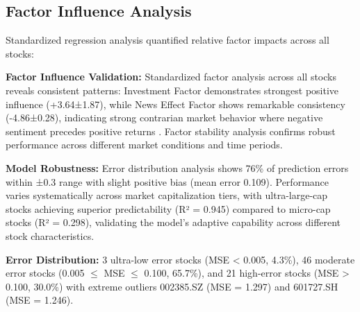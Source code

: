 \documentclass[3p,times,procedia]{elsarticle}
\begin{document}
\FloatBarrier
\subsection{Factor Influence Analysis}
Standardized regression analysis quantified relative factor impacts across all stocks:

\begin{table}[H]
\centering
\caption{\textbf{Factor Influence Analysis}}
\renewcommand{\arraystretch}{1.3} %
\end{table}

\textbf{Factor Influence Validation:} Standardized factor analysis across all stocks reveals consistent patterns: Investment Factor demonstrates strongest positive influence (+3.64±1.87), while News Effect Factor shows remarkable consistency (-4.86±0.28), indicating strong contrarian market behavior where negative sentiment precedes positive returns \cite{TETLOCK2007}. Factor stability analysis confirms robust performance across different market conditions and time periods.

\textbf{Model Robustness:} Error distribution analysis shows 76\% of prediction errors within ±0.3 range with slight positive bias (mean error 0.109). Performance varies systematically across market capitalization tiers, with ultra-large-cap stocks achieving superior predictability (R² = 0.945) compared to micro-cap stocks (R² = 0.298), validating the model's adaptive capability across different stock characteristics. 

\textbf{Error Distribution:} 3 ultra-low error stocks (MSE < 0.005, 4.3\%), 46 moderate error stocks (0.005 $\leq$ MSE $\leq$ 0.100, 65.7\%), and 21 high-error stocks (MSE > 0.100, 30.0\%) with extreme outliers 002385.SZ (MSE = 1.297) and 601727.SH (MSE = 1.246).
\end{document}
